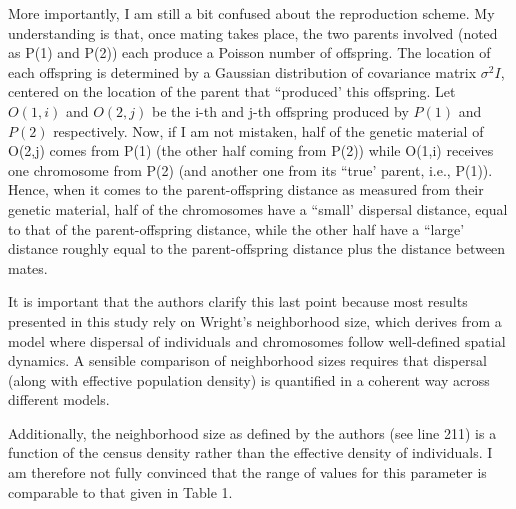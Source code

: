 \begin{point}{}
More importantly, I am still a bit confused about the reproduction scheme. My understanding is that, once mating takes place, the two parents involved (noted as P(1) and P(2)) each produce a Poisson number of offspring. The location of each offspring is determined by a Gaussian distribution of covariance matrix $\sigma^2 I$, centered on the location of the parent that ``produced' this offspring. Let $O(1,i)$ and $O(2,j)$ be the i-th and j-th offspring produced by $P(1)$ and $P(2)$ respectively. Now, if I am not mistaken, half of the genetic material of O(2,j) comes from P(1) (the other half coming from P(2)) while O(1,i) receives one chromosome from P(2) (and another one from its ``true' parent, i.e., P(1)). Hence, when it comes to the parent-offspring distance as measured from their genetic material, half of the chromosomes have a ``small' dispersal distance, equal to that of the parent-offspring distance, while the other half have a ``large' distance roughly equal to the parent-offspring distance plus the distance between mates.

It is important that the authors clarify this last point because most results presented in this study rely on Wright's neighborhood size, which derives from a model where dispersal of individuals and chromosomes follow well-defined spatial dynamics. A sensible comparison of neighborhood sizes requires that dispersal (along with effective population density) is quantified in a coherent way across different models.

Additionally, the neighborhood size as defined by the authors (see line 211) is a function of the census density rather than the effective density of individuals. I am therefore not fully convinced that the range of values for this parameter is comparable to that given in Table 1.
\end{point}

